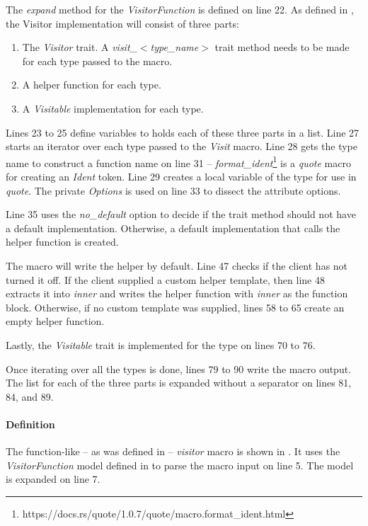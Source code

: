 The \textit{expand} method for the \textit{VisitorFunction} is defined on line 22.
As defined in , the Visitor implementation will consist of three parts:

\begin{enumerate}
	\item The \textit{Visitor} trait.
	      A \textit{visit\_$<$type\_name$>$} trait method needs to be made for each type passed to the macro.
	\item A helper function for each type.
	\item A \textit{Visitable} implementation for each type.
\end{enumerate}

Lines 23 to 25 define variables to holds each of these three parts in a list.
Line 27 starts an iterator over each type passed to the \textit{Visit} macro.
Line 28 gets the type name to construct a function name on line 31 -- \textit{format\_ident}\footnote{https://docs.rs/quote/1.0.7/quote/macro.format\_ident.html} is a \textit{quote} macro for creating an \textit{Ident} token.
Line 29 creates a local variable of the type for use in \textit{quote}.
The private \textit{Options} is used on line 33 to dissect the attribute options.

Line 35 uses the \textit{no\_default} option to decide if the trait method should not have a default implementation.
Otherwise, a default implementation that calls the helper function is created.

The macro will write the helper by default.
Line 47 checks if the client has not turned it off.
If the client supplied a custom helper template, then line 48 extracts it into \textit{inner} and writes the helper function with \textit{inner} as the function block.
Otherwise, if no custom template was supplied, lines 58 to 65 create an empty helper function.

Lastly, the \textit{Visitable} trait is implemented for the type on lines 70 to 76.

Once iterating over all the types is done, lines 79 to 90 write the macro output.
The list for each of the three parts is expanded without a separator on lines 81, 84, and 89.

\paragraph{Definition}
The function-like -- as was defined in  -- \textit{visitor} macro is shown in .
It uses the \textit{VisitorFunction} model defined in  to parse the macro input on line 5.
The model is expanded on line 7.

